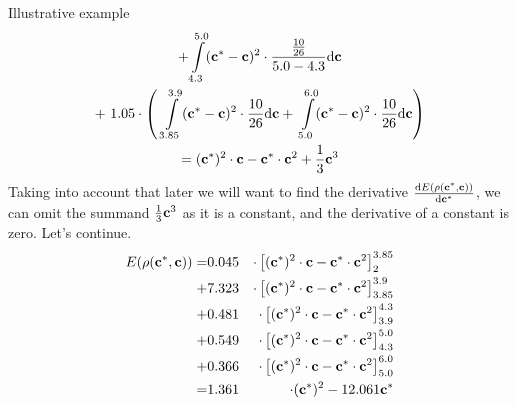 \begin{subsection}{Illustrative example}
\begin{gather*}
+ \int\limits_{4.3}^{5.0} (\textbf{c}^{*}-\textbf{c})^{2} \cdot \frac{\frac{10}{26}}{5.0-4.3} \mathrm{d}\textbf{c} \\
+ \ 1.05 \cdot \left( \ \int\limits_{3.85}^{3.9} (\textbf{c}^{*}-\textbf{c})^{2} \cdot \frac{10}{26} \mathrm{d}\textbf{c} + \
\int\limits_{5.0}^{6.0} (\textbf{c}^{*}-\textbf{c})^{2} \cdot \frac{10}{26} \mathrm{d}\textbf{c} \right) \\
=(\textbf{c}^{*})^{2} \cdot \textbf{c} - \textbf{c}^{*} \cdot \textbf{c}^{2} + \frac{1}{3} \textbf{c}^{3}
\end{gather*}
Taking into account that later we will want to find the derivative $\frac{\mathrm{d}E(\rho(\textbf{c}^{*},\textbf{c}))}{\mathrm{d}\textbf{c}^{*}}$, we can omit the summand $\frac{1}{3} \textbf{c}^{3}$ as it is a constant, and the derivative of a constant is zero. Let's continue.
\begin{eqnarray*}
E(\rho(\textbf{c}^{*},\textbf{c})) =& 0.045 & \cdot\left[ (\textbf{c}^{*})^{2} \cdot \textbf{c} - \textbf{c}^{*} \cdot \textbf{c}^{2} \right]_{2}^{3.85}  \\
+ & 7.323 &\cdot\left[ (\textbf{c}^{*})^{2} \cdot \textbf{c} - \textbf{c}^{*} \cdot \textbf{c}^{2} \right]_{3.85}^{3.9} \\
+ & 0.481 &\cdot\left[ (\textbf{c}^{*})^{2} \cdot \textbf{c} - \textbf{c}^{*} \cdot \textbf{c}^{2} \right]_{3.9}^{4.3}  \\
+ & 0.549 &\cdot\left[ (\textbf{c}^{*})^{2} \cdot \textbf{c} - \textbf{c}^{*} \cdot \textbf{c}^{2} \right]_{4.3}^{5.0}  \\
+ & 0.366 &\cdot\left[ (\textbf{c}^{*})^{2} \cdot \textbf{c} - \textbf{c}^{*} \cdot \textbf{c}^{2} \right]_{5.0}^{6.0}  \\
= & 1.361 &\cdot(\textbf{c}^{*})^{2}-12.061\textbf{c}^{*}
\end{eqnarray*}


\end{subsection}
